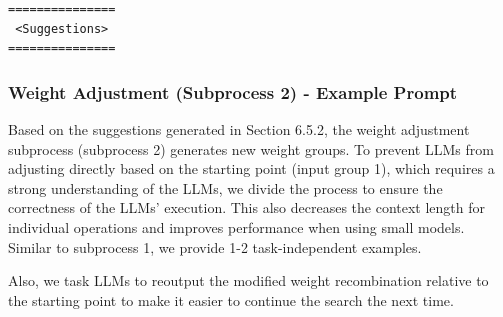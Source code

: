 \documentclass{article}
\begin{document}
\begin{verbatim}
===============
 <Suggestions>
===============
\end{verbatim}

\subsubsection{Weight Adjustment (Subprocess 2) - Example Prompt}
Based on the suggestions generated in Section 6.5.2, the weight adjustment subprocess (subprocess 2) generates new weight groups. To prevent LLMs from adjusting directly based on the starting point (input group 1), which requires a strong understanding of the LLMs, we divide the process to ensure the correctness of the LLMs' execution. This also decreases the context length for individual operations and improves performance when using small models. Similar to subprocess 1, we provide 1-2 task-independent examples.

Also, we task LLMs to reoutput the modified weight recombination relative to the starting point to make it easier to continue the search the next time.
\end{document}
